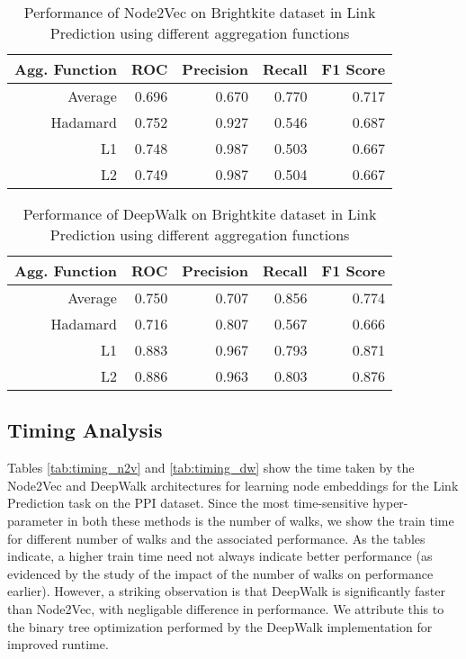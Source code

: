 \documentclass[sigconf]{acmart}
\begin{document}
\begin{table}[H]
\begin{tabular}{|r|r|r|r|r|}
\hline
\textbf{Agg. Function} & \textbf{ROC} & \textbf{Precision} & \textbf{Recall} & \textbf{F1 Score}\\
\hline
Average & 0.696   & 0.670 & 0.770 & 0.717   \\
Hadamard & 0.752 & 0.927 & 0.546 & 0.687   \\
L1 & 0.748 & 0.987 & 0.503 & 0.667   \\
L2 & 0.749 & 0.987 & 0.504 & 0.667 \\
\hline
\end{tabular}
\caption{Performance of Node2Vec on Brightkite dataset in Link Prediction using different aggregation functions}
\label{tab:agg_n2v_brightkite}
\end{table}


\begin{table}[H]
\begin{tabular}{|r|r|r|r|r|}
\hline
\textbf{Agg. Function} & \textbf{ROC} & \textbf{Precision} & \textbf{Recall} & \textbf{F1 Score}\\
\hline
Average & 0.750 & 0.707 & 0.856 & 0.774  \\
Hadamard & 0.716 & 0.807 & 0.567 & 0.666   \\
L1 & 0.883 & 0.967 & 0.793 & 0.871   \\
L2 & 0.886 & 0.963 & 0.803 & 0.876 \\
\hline
\end{tabular}
\caption{Performance of DeepWalk on Brightkite dataset in Link Prediction using different aggregation functions}
\label{tab:agg_dw_brightkite}
\end{table}


\subsection{Timing Analysis}
Tables \ref{tab:timing_n2v} and \ref{tab:timing_dw} show the time taken by the Node2Vec and DeepWalk architectures for learning node embeddings for the Link Prediction task on the PPI dataset. Since the most time-sensitive hyper-parameter in both these methods is the number of walks, we show the train time for different number of walks and the associated performance. As the tables indicate, a higher train time need not always indicate better performance (as evidenced by the study of the impact of the number of walks on performance earlier). However, a striking observation is that DeepWalk is significantly faster than Node2Vec, with negligable difference in performance. We attribute this to the binary tree optimization performed by the DeepWalk implementation for improved runtime.
\end{document}

